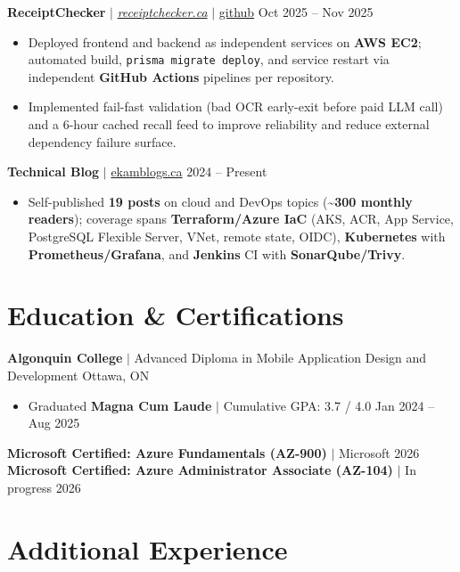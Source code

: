 \documentclass[11pt,a4paper]{article}
\begin{document}
\vspace{4pt}

\textbf{ReceiptChecker} $|$ \href{https://receiptchecker.ca/}{\emph{receiptchecker.ca}} $|$ \href{https://github.com/bhat0155/receipt-check}{\small github} \hfill Oct 2025 -- Nov 2025
\begin{itemize}
    \item Deployed frontend and backend as independent services on \textbf{AWS EC2}; automated build, \texttt{prisma migrate deploy}, and service restart via independent \textbf{GitHub Actions} pipelines per repository.
    \item Implemented fail-fast validation (bad OCR early-exit before paid LLM call) and a 6-hour cached recall feed to improve reliability and reduce external dependency failure surface.
\end{itemize}

\vspace{4pt}

\textbf{Technical Blog} $|$ \href{https://www.ekamblogs.ca}{ekamblogs.ca} \hfill 2024 -- Present
\begin{itemize}
    \item Self-published \textbf{19 posts} on cloud and DevOps topics (\textasciitilde\textbf{300 monthly readers}); coverage spans \textbf{Terraform/Azure IaC} (AKS, ACR, App Service, PostgreSQL Flexible Server, VNet, remote state, OIDC), \textbf{Kubernetes} with \textbf{Prometheus/Grafana}, and \textbf{Jenkins} CI with \textbf{SonarQube/Trivy}.
\end{itemize}

\section{Education \& Certifications}

\textbf{Algonquin College} $|$ Advanced Diploma in Mobile Application Design and Development \hfill Ottawa, ON
\begin{itemize}
    \item Graduated \textbf{Magna Cum Laude} $|$ Cumulative GPA: 3.7 / 4.0 \hfill Jan 2024 -- Aug 2025
\end{itemize}
\textbf{Microsoft Certified: Azure Fundamentals (AZ-900)} $|$ Microsoft \hfill 2026 \\
\textbf{Microsoft Certified: Azure Administrator Associate (AZ-104)} $|$ In progress \hfill 2026

\section{Additional Experience}
\end{document}
